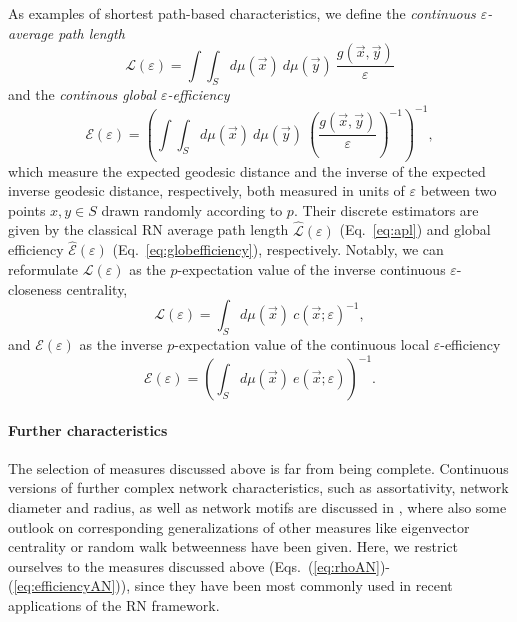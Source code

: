 		As examples of shortest path-based characteristics, we define the \emph{continuous $\varepsilon$-average path length}
\begin{equation}
\mathcal{L}(\varepsilon)=\int\int_S d\mu(\vec{x})\ d\mu(\vec{y})\ \frac{g(\vec{x},\vec{y})}{\varepsilon}
\end{equation}
\noindent
and the \emph{continous global $\varepsilon$-efficiency}
\begin{equation}
\mathcal{E}(\varepsilon)=\left(\int\int_S d\mu(\vec{x})\ d\mu(\vec{y})\ \left(\frac{g(\vec{x},\vec{y})}{\varepsilon}\right)^{-1}\right)^{-1},
\end{equation}
\noindent
which measure the expected geodesic distance and the inverse of the expected inverse geodesic distance, respectively, both measured in units of $\varepsilon$ between two points $x,y\in S$ drawn randomly according to $p$. Their discrete estimators are given by the classical RN average path length $\hat{\mathcal{L}}(\varepsilon)$ (Eq.~\ref{eq:apl}) and global efficiency $\hat{\mathcal{E}}(\varepsilon)$ (Eq.~\ref{eq:globefficiency}), respectively. Notably, we can reformulate $\mathcal{L}(\varepsilon)$ as the $p$-expectation value of the inverse continuous $\varepsilon$-closeness centrality,
\begin{equation}
\mathcal{L}(\varepsilon)=\int_S d\mu(\vec{x})\ c(\vec{x};\varepsilon)^{-1},
\end{equation}
\noindent
and $\mathcal{E}(\varepsilon)$ as the inverse $p$-expectation value of the continuous local $\varepsilon$-efficiency
\begin{equation} \label{eq:efficiencyAN}
\mathcal{E}(\varepsilon)=\left(\int_S d\mu(\vec{x})\ e(\vec{x};\varepsilon)\right)^{-1}.
\end{equation}


		\paragraph{Further characteristics}
		The selection of measures discussed above is far from being complete. Continuous versions of further complex network characteristics, such as assortativity, network diameter and radius, as well as network motifs are discussed in \cite{Donges2012}, where also some outlook on corresponding generalizations of other measures like eigenvector centrality or random walk betweenness have been given. Here, we restrict ourselves to the measures discussed above (Eqs.~(\ref{eq:rhoAN})-(\ref{eq:efficiencyAN})), since they have been most commonly used in recent applications of the RN framework.


